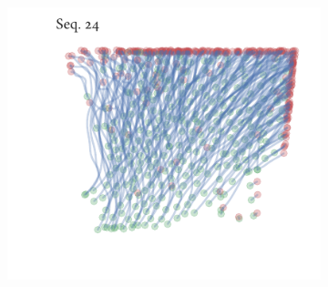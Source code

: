 \begin{figure}[h]
\begin{subfigure}[t]{0.5\textwidth}
	\end{subfigure}%
	\begin{subfigure}[t]{0.5\textwidth}
		\centering
		\includegraphics{sequence24.pdf}
	\end{subfigure}
\end{figure}
